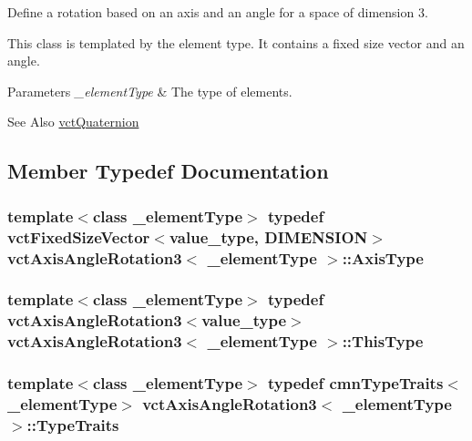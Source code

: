 Define a rotation based on an axis and an angle for a space of dimension 3. 

This class is templated by the element type. It contains a fixed size vector and an angle.


\begin{DoxyParams}{Parameters}
{\em \-\_\-element\-Type} & The type of elements.\\
\hline
\end{DoxyParams}
\begin{DoxySeeAlso}{See Also}
\hyperlink{classvct_quaternion}{vct\-Quaternion} 
\end{DoxySeeAlso}


\subsection{Member Typedef Documentation}
\hypertarget{classvct_axis_angle_rotation3_a3178fd901bb60bb447711b9d5f7e7aae}{
\subsubsection[{Axis\-Type}]{\setlength{\rightskip}{0pt plus 5cm}template$<$class \-\_\-element\-Type$>$ typedef {\bf vct\-Fixed\-Size\-Vector}$<$value\-\_\-type, {\bf D\-I\-M\-E\-N\-S\-I\-O\-N}$>$ {\bf vct\-Axis\-Angle\-Rotation3}$<$ \-\_\-element\-Type $>$\-::{\bf Axis\-Type}}}\label{classvct_axis_angle_rotation3_a3178fd901bb60bb447711b9d5f7e7aae}
\hypertarget{classvct_axis_angle_rotation3_af654a8037b7b82a378f69cb1bfd9b8dd}{
\subsubsection[{This\-Type}]{\setlength{\rightskip}{0pt plus 5cm}template$<$class \-\_\-element\-Type$>$ typedef {\bf vct\-Axis\-Angle\-Rotation3}$<$value\-\_\-type$>$ {\bf vct\-Axis\-Angle\-Rotation3}$<$ \-\_\-element\-Type $>$\-::{\bf This\-Type}}}\label{classvct_axis_angle_rotation3_af654a8037b7b82a378f69cb1bfd9b8dd}
\hypertarget{classvct_axis_angle_rotation3_a7765132e2cf950c6598eb4d75e6fc297}{
\subsubsection[{Type\-Traits}]{\setlength{\rightskip}{0pt plus 5cm}template$<$class \-\_\-element\-Type$>$ typedef {\bf cmn\-Type\-Traits}$<$\-\_\-element\-Type$>$ {\bf vct\-Axis\-Angle\-Rotation3}$<$ \-\_\-element\-Type $>$\-::{\bf Type\-Traits}}}\label{classvct_axis_angle_rotation3_a7765132e2cf950c6598eb4d75e6fc297}


